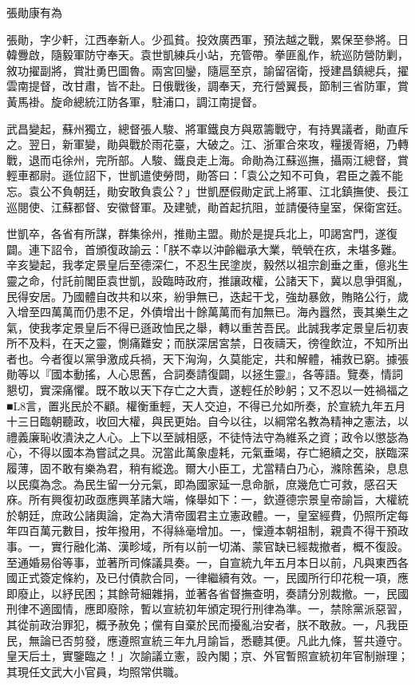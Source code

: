 
\begin{pinyinscope}
張勛康有為

張勛，字少軒，江西奉新人。少孤貧。投效廣西軍，預法越之戰，累保至參將。日韓釁啟，隨毅軍防守奉天。袁世凱練兵小站，充管帶。拳匪亂作，統巡防營防剿，敘功擢副將，賞壯勇巴圖魯。兩宮回鑾，隨扈至京，諭留宿衛，授建昌鎮總兵，擢雲南提督，改甘肅，皆不赴。日俄戰後，調奉天，充行營翼長，節制三省防軍，賞黃馬褂。旋命總統江防各軍，駐浦口，調江南提督。

武昌變起，蘇州獨立，總督張人駿、將軍鐵良方與眾籌戰守，有持異議者，勛直斥之。翌日，新軍變，勛與戰於雨花臺，大破之。江、浙軍合來攻，糧援胥絕，乃轉戰，退而屯徐州，完所部。人駿、鐵良走上海。命勛為江蘇巡撫，攝兩江總督，賞輕車都尉。遜位詔下，世凱遣使勞問，勛答曰：「袁公之知不可負，君臣之義不能忘。袁公不負朝廷，勛安敢負袁公？」世凱歷假勛定武上將軍、江北鎮撫使、長江巡閱使、江蘇都督、安徽督軍。及建號，勛首起抗阻，並請優待皇室，保衛宮廷。

世凱卒，各省有所謀，群集徐州，推勛主盟。勛於是提兵北上，叩謁宮門，遂復闢。連下詔令，首頒復政諭云：「朕不幸以沖齡繼承大業，煢煢在疚，未堪多難。辛亥變起，我孝定景皇后至德深仁，不忍生民塗炭，毅然以祖宗創垂之重，億兆生靈之命，付託前閣臣袁世凱，設臨時政府，推讓政權，公諸天下，冀以息爭弭亂，民得安居。乃國體自改共和以來，紛爭無已，迭起干戈，強劫暴斂，賄賂公行，歲入增至四萬萬而仍患不足，外債增出十餘萬萬而有加無已。海內囂然，喪其樂生之氣，使我孝定景皇后不得已遜政恤民之舉，轉以重苦吾民。此誠我孝定景皇后初衷所不及料，在天之靈，惻痛難安；而朕深居宮禁，日夜禱天，徬徨飲泣，不知所出者也。今者復以黨爭激成兵禍，天下洶洶，久莫能定，共和解體，補救已窮。據張勛等以『國本動搖，人心思舊，合詞奏請復闢，以拯生靈』，各等語。覽奏，情詞懇切，實深痛懼。既不敢以天下存亡之大責，遂輕任於眇躬；又不忍以一姓禍福之■L8言，置兆民於不顧。權衡重輕，天人交迫，不得已允如所奏，於宣統九年五月十三日臨朝聽政，收回大權，與民更始。自今以往，以綱常名教為精神之憲法，以禮義廉恥收潰決之人心。上下以至誠相感，不徒恃法守為維系之資；政令以懲毖為心，不得以國本為嘗試之具。況當此萬象虛耗，元氣垂竭，存亡絕續之交，朕臨深履薄，固不敢有樂為君，稍有縱逸。爾大小臣工，尤當精白乃心，滌除舊染，息息以民瘼為念。為民生留一分元氣，即為國家延一息命脈，庶幾危亡可救，感召天庥。所有興復初政亟應興革諸大端，條舉如下：一，欽遵德宗景皇帝諭旨，大權統於朝廷，庶政公諸輿論，定為大清帝國君主立憲政體。一，皇室經費，仍照所定每年四百萬元數目，按年撥用，不得絲毫增加。一，懍遵本朝祖制，親貴不得干預政事。一，實行融化滿、漢畛域，所有以前一切滿、蒙官缺已經裁撤者，概不復設。至通婚易俗等事，並著所司條議具奏。一，自宣統九年五月本日以前，凡與東西各國正式簽定條約，及已付債款合同，一律繼續有效。一，民國所行印花稅一項，應即廢止，以紓民困；其餘苛細雜捐，並著各省督撫查明，奏請分別裁撤。一，民國刑律不適國情，應即廢除，暫以宣統初年頒定現行刑律為準。一，禁除黨派惡習，其從前政治罪犯，概予赦免；儻有自棄於民而擾亂治安者，朕不敢赦。一，凡我臣民，無論已否剪發，應遵照宣統三年九月諭旨，悉聽其便。凡此九條，誓共遵守。皇天后土，實鑒臨之！」次諭議立憲，設內閣；京、外官暫照宣統初年官制辦理；其現任文武大小官員，均照常供職。


\end{pinyinscope}
